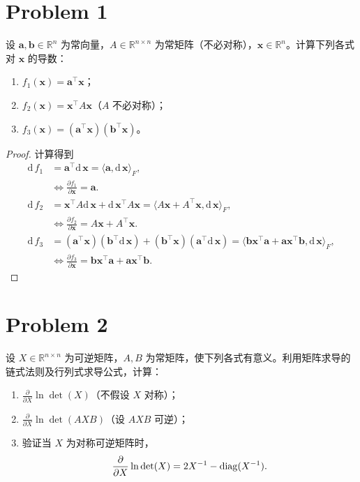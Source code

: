\section*{Problem 1}

设 $\bm{a}, \bm{b} \in \mathbb{R}^n$ 为常向量，$A \in \mathbb{R}^{n \times n}$ 为常矩阵（不必对称），$\bm{x} \in \mathbb{R}^n$。计算下列各式对 $\bm{x}$ 的导数：

\begin{enumerate}
    \item $f_1(\bm{x}) = \bm{a}^\top \bm{x}$；
    \item $f_2(\bm{x}) = \bm{x}^\top A \bm{x}$（$A$ 不必对称）；
    \item $f_3(\bm{x}) = \left(\bm{a}^\top \bm{x}\right)\left(\bm{b}^\top \bm{x}\right)$。
\end{enumerate}

\begin{proof}
    计算得到
    \[
    \begin{aligned}
        \mathrm{d}\,f_1 &= \bm{a}^\top \mathrm{d}\,\bm{x} = \langle \bm{a}, \mathrm{d}\,\bm{x} \rangle_F, \\
        &\iff \frac{\partial f_1}{\partial \bm{x}} = \bm{a}.\\
        \mathrm{d}\,f_2 &= \bm{x}^\top A \mathrm{d}\,\bm{x} + \mathrm{d}\,\bm{x}^\top A \bm{x} = \langle A\bm{x} + A^\top \bm{x}, \mathrm{d}\,\bm{x} \rangle_F, \\
        &\iff \frac{\partial f_2}{\partial \bm{x}} = A\bm{x} + A^\top \bm{x}.\\
        \mathrm{d}\,f_3 &= (\bm{a}^\top \bm{x})(\bm{b}^\top \mathrm{d}\,\bm{x}) + (\bm{b}^\top \bm{x})(\bm{a}^\top \mathrm{d}\,\bm{x}) = \langle \bm{b}\bm{x}^\top\bm{a} + \bm{a}\bm{x}^\top\bm{b}, \mathrm{d}\,\bm{x} \rangle_F, \\
        &\iff \frac{\partial f_3}{\partial \bm{x}} = \bm{b}\bm{x}^\top\bm{a} + \bm{a}\bm{x}^\top\bm{b}.
    \end{aligned}
    \]
\end{proof}

\section*{Problem 2}

设 $X \in \mathbb{R}^{n \times n}$ 为可逆矩阵，$A, B$ 为常矩阵，使下列各式有意义。利用矩阵求导的链式法则及行列式求导公式，计算：

\begin{enumerate}
    \item $\displaystyle \frac{\partial}{\partial X} \ln \det(X)$（不假设 $X$ 对称）；
    \item $\displaystyle \frac{\partial}{\partial X} \ln \det(AXB)$（设 $AXB$ 可逆）；
    \item 验证当 $X$ 为对称可逆矩阵时，
    \[
        \frac{\partial}{\partial X} \ln \det(X)
        =
        2X^{-1} - \mathrm{diag}(X^{-1}).
    \]
\end{enumerate}

